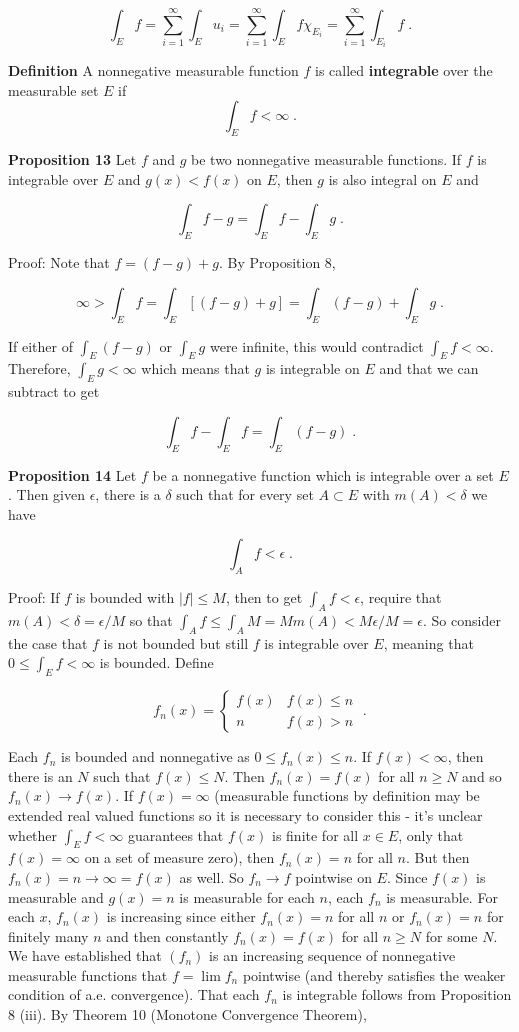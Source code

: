 \documentclass[a4paper]{article}
\begin{document}
$$\int_E f = \sum_{i=1}^\infty \int_E u_i = \sum_{i=1}^\infty \int_E f\chi_{E_i} = \sum_{i=1}^\infty \int_{E_i} f \;.$$

{\bf Definition} A nonnegative measurable function $f$ is called {\bf integrable} over the measurable set $E$ if $$\int_E f < \infty \;.$$

{\bf Proposition 13} Let $f$ and $g$ be two nonnegative measurable functions. If $f$ is integrable over $E$ and $g(x) < f(x)$ on $E$, then $g$ is also integral on $E$ and

$$\int_E f-g = \int_E f - \int_E g \;.$$

Proof: Note that $f = (f-g) + g$. By Proposition 8,

$$\infty > \int_E f = \int_E [(f-g) + g] = \int_E (f-g) + \int_E g \;.$$

If either of $\int_E (f-g)$ or $\int_E g$ were infinite, this would contradict $\int_E f < \infty$. Therefore, $\int_E g < \infty$ which means that $g$ is integrable on $E$ and that we can subtract to get

$$\int_E f - \int_E f = \int_E (f-g) \;.$$

{\bf Proposition 14} Let $f$ be a nonnegative function which is integrable over a set $E$. Then given $\epsilon$, there is a $\delta$ such that for every set $A \subset E$ with $m(A) < \delta$ we have 

$$\int_A f < \epsilon \;.$$

Proof: If $f$ is bounded with $|f| \leq M$, then to get $\int_A f < \epsilon$, require that $m(A) < \delta = \epsilon / M$ so that $\int_A f \leq \int_A M = Mm(A) < M\epsilon / M = \epsilon$. So consider the case that $f$ is not bounded but still $f$ is integrable over $E$, meaning that $0 \leq \int_E f < \infty$ is bounded. Define

$$f_n(x) = \begin{cases}
f(x) & f(x) \leq n \\ n & f(x) > n \end{cases} \;. $$

Each $f_n$ is bounded and nonnegative as $0\leq f_n(x) \leq n$. If $f(x) <\infty$, then there is an $N$ such that $f(x) \leq N$. Then $f_n(x) = f(x)$ for all $n \geq N$ and so $f_n(x) \rightarrow f(x)$. If $f(x) = \infty$ (measurable functions by definition may be extended real valued functions so it is necessary to consider this - it's unclear whether $\int_E f < \infty$ guarantees that $f(x)$ is finite for all $x \in E$, only that $f(x) = \infty$ on a set of measure zero), then $f_n(x) = n$ for all $n$. But then $f_n(x) = n \rightarrow \infty = f(x)$ as well. So $f_n \rightarrow f$ pointwise on $E$. Since $f(x)$ is measurable and $g(x) = n$ is measurable for each $n$, each $f_n$ is measurable. For each $x$, $f_n(x)$ is increasing since either $f_n(x) = n$ for all $n$ or $f_n(x) = n$ for finitely many $n$ and then constantly $f_n(x) = f(x)$ for all $n\geq N$ for some $N$. We have established that $(f_n)$ is an increasing sequence of nonnegative measurable functions that $f = \lim f_n$ pointwise (and thereby satisfies the weaker condition of a.e. convergence). That each $f_n$ is integrable follows from Proposition 8 (iii). By Theorem 10 (Monotone Convergence Theorem), 
\end{document}
